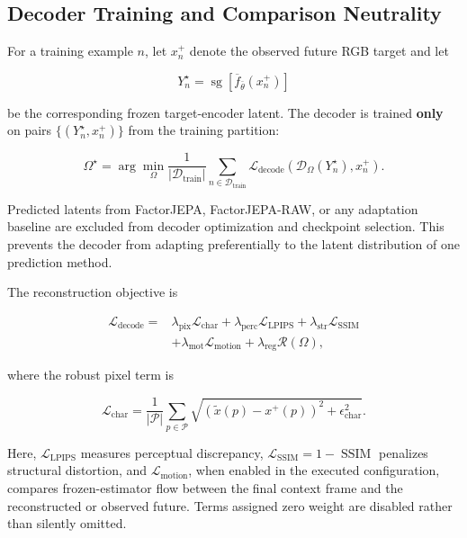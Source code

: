\subsection{Decoder Training and Comparison Neutrality}
\label{app:rgb_training}

For a training example \(n\), let \(x_n^+\) denote the observed future
RGB target and let

\[
Y_n^\star
=
\operatorname{sg}
\left[
\overline f_{\bar\theta}(x_n^+)
\right]
\]

be the corresponding frozen target-encoder latent. The decoder is
trained \textbf{only} on pairs
\(\{(Y_n^\star,x_n^+)\}\) from the training partition:

\begin{equation*}
\Omega^\star
=
\arg\min_{\Omega}
\frac{1}{|\mathcal D_{\mathrm{train}}|}
\sum_{n\in\mathcal D_{\mathrm{train}}}
\mathcal L_{\mathrm{decode}}
\left(
\mathcal D_\Omega(Y_n^\star),
x_n^+
\right).
\end{equation*}

Predicted latents from FactorJEPA, FactorJEPA-RAW, or any adaptation
baseline are excluded from decoder optimization and checkpoint
selection. This prevents the decoder from adapting preferentially to
the latent distribution of one prediction method.

The reconstruction objective is

\begin{equation*}
\begin{aligned}
\mathcal L_{\mathrm{decode}}
={}&
\lambda_{\mathrm{pix}}\mathcal L_{\mathrm{char}}
+
\lambda_{\mathrm{perc}}\mathcal L_{\mathrm{LPIPS}}
+
\lambda_{\mathrm{str}}\mathcal L_{\mathrm{SSIM}}
\\
&+
\lambda_{\mathrm{mot}}\mathcal L_{\mathrm{motion}}
+
\lambda_{\mathrm{reg}}\mathcal R(\Omega),
\end{aligned}
\end{equation*}

where the robust pixel term is

\begin{equation*}
\mathcal L_{\mathrm{char}}
=
\frac{1}{|\mathcal P|}
\sum_{p\in\mathcal P}
\sqrt{
\left(
\widetilde x(p)-x^+(p)
\right)^2+\epsilon_{\mathrm{char}}^2
}.
\end{equation*}

Here,
\(\mathcal L_{\mathrm{LPIPS}}\) measures perceptual discrepancy,
\(\mathcal L_{\mathrm{SSIM}}=1-\operatorname{SSIM}\) penalizes
structural distortion, and \(\mathcal L_{\mathrm{motion}}\), when
enabled in the executed configuration, compares frozen-estimator flow
between the final context frame and the reconstructed or observed
future. Terms assigned zero weight are disabled rather than silently
omitted.

